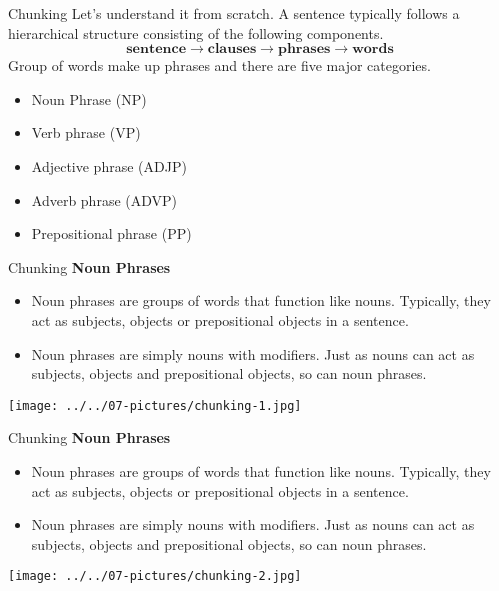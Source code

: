 \documentclass[11pt]{beamer}
\begin{document}
\begin{frame}{Chunking}
Let’s understand it from scratch. A sentence typically follows a hierarchical structure consisting of the following components.
$$\textbf{sentence} \rightarrow \textbf{clauses} \rightarrow \textbf{phrases} \rightarrow \textbf{words}$$ 
Group of words make up phrases and there are five major categories.
\begin{itemize}
\item Noun Phrase (NP)
\item Verb phrase (VP)
\item Adjective phrase (ADJP)
\item Adverb phrase (ADVP)
\item Prepositional phrase (PP)
\end{itemize}
\end{frame}
\begin{frame}{Chunking}
\textbf{Noun Phrases}
\begin{itemize}
\item Noun phrases are groups of words that function like nouns. Typically, they act as subjects, objects or prepositional objects in a sentence.
\item Noun phrases are simply nouns with modifiers. Just as nouns can act as subjects, objects and prepositional objects, so can noun phrases.
\end{itemize}
	\begin{center}
	\texttt{[image: ../../07-pictures/chunking-1.jpg]}
	\end{center}
\end{frame}
\begin{frame}{Chunking}
\textbf{Noun Phrases}
\begin{itemize}
\item Noun phrases are groups of words that function like nouns. Typically, they act as subjects, objects or prepositional objects in a sentence.
\item Noun phrases are simply nouns with modifiers. Just as nouns can act as subjects, objects and prepositional objects, so can noun phrases.
\end{itemize}
	\begin{center}
	\texttt{[image: ../../07-pictures/chunking-2.jpg]}
	\end{center}
\end{frame}
\end{document}
